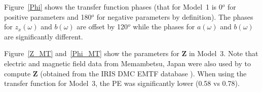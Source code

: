 \documentclass[draft,linenumbers]{agujournal2018}
\begin{document}
Figure~\ref{Phi} shows the transfer function phases (that for Model~1 is 0$^o$ for positive parameters and 180$^o$ for negative parameters by definition). The phases for $z_x(\omega)$ and $b(\omega)$ are offset by 120$^o$ while the phases for $a(\omega)$ and $b(\omega)$ are significantly different.

Figure~\ref{Z_MT} and~\ref{Phi_MT} show the parameters for $\mathbf{Z}$ in Model~3. Note that electric and magnetic field data from Memambetsu, Japan were also used by \cite{Fujii2015} to compute $\mathbf{Z}$ (obtained from the IRIS DMC EMTF database \cite{Kelbert2011}). When using the \cite{Fujii2015} transfer function for Model~3, the PE was significantly lower (0.58 vs 0.78). 




\end{document}
